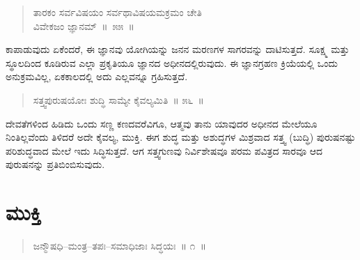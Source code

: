 \vspace{-0.2cm}

\begin{verse}
ತಾರಕಂ ಸರ್ವವಿಷಯಂ ಸರ್ವಥಾವಿಷಯಮಕ್ರಮಂ ಚೇತಿ\\
 ವಿವೇಕಜಂ ಜ್ಞಾನಮ್​~\hfill{॥~೫೫~॥}
\end{verse}

\vspace{-0.4cm}


\vspace{0.2cm}

ಕಾಪಾಡುವುದು ಏಕೆಂದರೆ, ಈ ಜ್ಞಾನವು ಯೋಗಿಯನ್ನು ಜನನ ಮರಣಗಳ ಸಾಗರವನ್ನು ದಾಟಿಸುತ್ತದೆ. ಸೂಕ್ಷ್ಮ ಮತ್ತು ಸ್ಥೂಲದಿಂದ ಕೂಡಿರುವ ಎಲ್ಲಾ ಪ್ರಕೃತಿಯೂ ಜ್ಞಾನದ ಅಧೀನದಲ್ಲಿರುವುದು. ಈ ಜ್ಞಾನಗ್ರಹಣ ಕ್ರಿಯೆಯಲ್ಲಿ ಒಂದು ಅನುಕ್ರಮವಿಲ್ಲ, ಏಕಕಾಲದಲ್ಲಿ ಅದು ಎಲ್ಲವನ್ನೂ ಗ್ರಹಿಸುತ್ತದೆ. 

\vspace{-0.2cm}

\begin{verse}
ಸತ್ತ್ವಪುರುಷಯೋಃ ಶುದ್ಧಿ ಸಾಮ್ಯೇ ಕೈವಲ್ಯಮಿತಿ~॥ ೫೬~॥
\end{verse}

\vspace{-0.4cm}


\vspace{0.2cm}

ದೇವತೆಗಳಿಂದ ಹಿಡಿದು ಒಂದು ಸಣ್ಣ ಕಣದವರೆವಿಗೂ, ಆತ್ಮವು ತಾನು ಯಾವುದರ ಅಧೀನದ ಮೇಲೆಯೂ ನಿಂತಿಲ್ಲವೆಂದು ತಿಳಿದರೆ ಅದೇ ಕೈವಲ್ಯ, ಮುಕ್ತಿ. ಈಗ ಶುದ್ಧ ಮತ್ತು ಅಶುದ್ಧಗಳ ಮಿಶ್ರವಾದ ಸತ್ತ್ವ (ಬುದ್ಧಿ) ಪುರುಷನಷ್ಟು ಪರಿಶುದ್ಧವಾದ ಮೇಲೆ ಇದು ಸಿದ್ಧಿಸುತ್ತದೆ. ಆಗ ಸತ್ತ್ವಗುಣವು ನಿರ್ವಿಶೇಷವೂ ಪರಮ ಪವಿತ್ರದ ಸಾರವೂ ಆದ ಪುರುಷನನ್ನು ಪ್ರತಿಬಿಂಬಿಸುವುದು.

\chapter{ಮುಕ್ತಿ}%

\vspace{0.1cm}

\begin{verse}
ಜನ್ಮೌಷಧಿ–ಮಂತ್ರ–ತಪಃ–ಸಮಾಧಿಜಾಃ ಸಿದ್ಧಯಃ~॥ ೧~॥
\end{verse}

\vspace{-0.6cm}


